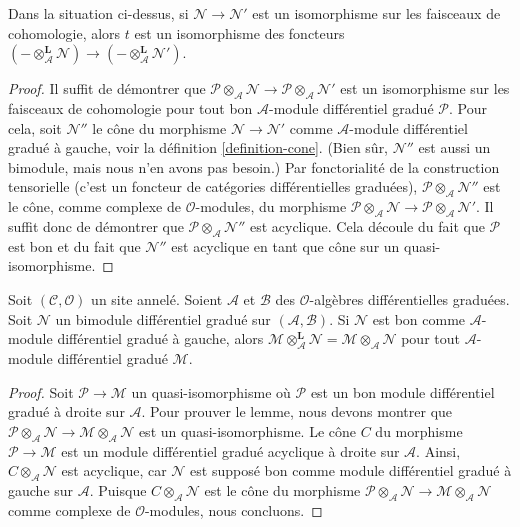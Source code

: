 \begin{lemma}
\label{lemma-tensor-symmetry} Dans
la situation ci-dessus, si $\mathcal{N} \to \mathcal{N}'$ est un isomorphisme sur
les faisceaux de cohomologie, alors $t$ est un isomorphisme des
foncteurs $(- \otimes_\mathcal{A}^\mathbf{L} \mathcal{N}) \to
(- \otimes_\mathcal{A}^\mathbf{L} \mathcal{N}')$.
\end{lemma}

\begin{proof}
Il suffit de démontrer que
$\mathcal{P} \otimes_\mathcal{A} \mathcal{N} \to
\mathcal{P} \otimes_\mathcal{A} \mathcal{N}'$ est
un isomorphisme sur les faisceaux de cohomologie pour tout bon
$\mathcal{A}$-module différentiel gradué $\mathcal{P}$.
Pour cela, soit $\mathcal{N}''$ le cône du morphisme
$\mathcal{N} \to \mathcal{N}'$ comme
$\mathcal{A}$-module différentiel gradué à gauche, voir la définition \ref{definition-cone}.
(Bien sûr, $\mathcal{N}''$ est aussi un bimodule, mais
nous n'en avons pas besoin.) Par fonctorialité de la construction
tensorielle (c'est un foncteur de catégories
différentielles graduées), $\mathcal{P} \otimes_\mathcal{A} \mathcal{N}''$
est le cône, comme complexe de $\mathcal{O}$-modules, du
morphisme $\mathcal{P} \otimes_\mathcal{A} \mathcal{N} \to
\mathcal{P} \otimes_\mathcal{A} \mathcal{N}'$.
Il suffit donc de démontrer
que $\mathcal{P} \otimes_\mathcal{A} \mathcal{N}''$
est acyclique. Cela découle du fait que $\mathcal{P}$ est bon
et du fait que $\mathcal{N}''$ est acyclique en tant
que cône sur un quasi-isomorphisme.
\end{proof}

\begin{lemma}
\label{lemma-good-on-other-side}
Soit $(\mathcal{C}, \mathcal{O})$ un site annelé. Soient
$\mathcal{A}$ et $\mathcal{B}$ des $\mathcal{O}$-algèbres différentielles
graduées. Soit $\mathcal{N}$ un bimodule différentiel
gradué sur $(\mathcal{A}, \mathcal{B})$. Si $\mathcal{N}$ est
bon comme $\mathcal{A}$-module différentiel gradué à
gauche, alors $\mathcal{M} \otimes_\mathcal{A}^\mathbf{L} \mathcal{N} =
\mathcal{M} \otimes_\mathcal{A} \mathcal{N}$ pour tout
$\mathcal{A}$-module différentiel gradué $\mathcal{M}$.
\end{lemma}

\begin{proof}
Soit $\mathcal{P} \to \mathcal{M}$ un quasi-isomorphisme où
$\mathcal{P}$ est un bon module différentiel gradué à droite sur $\mathcal{A}$. Pour
prouver le lemme, nous devons montrer que
$\mathcal{P} \otimes_\mathcal{A} \mathcal{N} \to
\mathcal{M} \otimes_\mathcal{A} \mathcal{N}$ est un
quasi-isomorphisme. Le cône $C$ du morphisme
$\mathcal{P} \to \mathcal{M}$ est un module différentiel gradué acyclique
à droite sur $\mathcal{A}$. Ainsi,
$C \otimes_\mathcal{A} \mathcal{N}$ est acyclique, car $\mathcal{N}$
est supposé bon comme module différentiel gradué à gauche sur $\mathcal{A}$.
Puisque $C \otimes_\mathcal{A} \mathcal{N}$ est le cône du
morphisme $\mathcal{P} \otimes_\mathcal{A} \mathcal{N} \to
\mathcal{M} \otimes_\mathcal{A} \mathcal{N}$ comme complexe de
$\mathcal{O}$-modules, nous concluons.
\end{proof}

